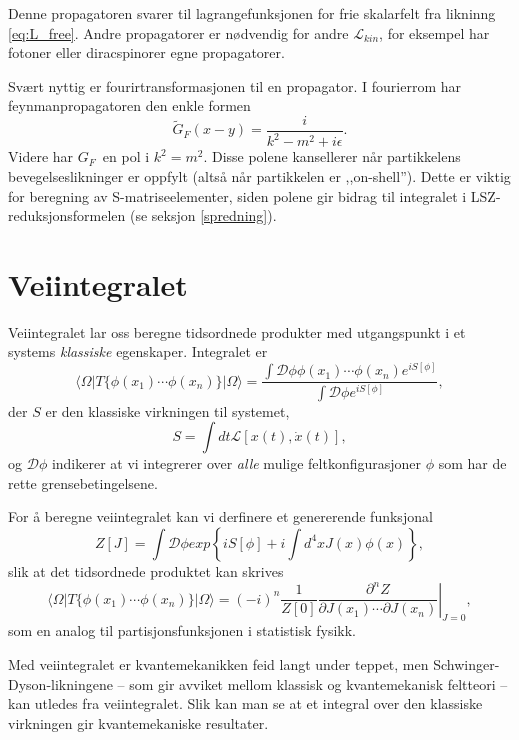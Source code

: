 \documentclass{article}
\renewcommand{\L}{\mathcal{L}}
\newcommand{\D}{\mathcal{D}}
\newcommand{\bra}[1]{\langle {#1} \mathclose|}
\newcommand{\ket}[1]{\mathopen| {#1} \rangle}
\begin{document}
Denne propagatoren svarer til lagrangefunksjonen for frie skalarfelt fra likninng \eqref{eq:L_free}.
Andre propagatorer er nødvendig for andre $\L_{kin}$, for eksempel har fotoner eller diracspinorer egne propagatorer.

Svært nyttig er fourirtransformasjonen til en propagator. 
I fourierrom har feynmanpropagatoren den enkle formen
\begin{equation*}
    \tilde{G}_F(x - y) = \frac{i}{k^2 - m^2 + i\epsilon}.
\end{equation*}
Videre har $G_F$ en pol i $k^2 = m^2$. 
Disse polene kansellerer når partikkelens bevegelseslikninger er oppfylt (altså når partikkelen er ,,on-shell'').
Dette er viktig for beregning av S-matriseelementer, siden polene gir bidrag til integralet i LSZ-reduksjonsformelen (se seksjon \ref{spredning}).

\section{Veiintegralet}
Veiintegralet lar oss beregne tidsordnede produkter med utgangspunkt i et systems \emph{klassiske} egenskaper.
Integralet er 
\begin{equation*}
        \bra{\Omega} T\{\phi(x_1) \cdots \phi(x_n)\}\ket{\Omega}
        = \frac{\int \D \phi \phi(x_1) \cdots \phi(x_n) e^{iS[\phi]}}{\int \D \phi e^{iS[\phi]}},
\end{equation*}
der $S$ er den klassiske virkningen til systemet,
\begin{equation*}
    S = \int dt \L[x(t), \dot{x}(t)],
\end{equation*}
og $\D\phi$ indikerer at vi integrerer over \emph{alle} mulige feltkonfigurasjoner $\phi$ som har de rette grensebetingelsene.

For å beregne veiintegralet kan vi derfinere et genererende funksjonal
\begin{equation*}
    Z[J] = \int \D \phi exp \left\{iS[\phi] + i\int d^4x J(x)\phi(x)\right\},
\end{equation*}
slik at det tidsordnede produktet kan skrives
\begin{equation*}
        \bra{\Omega} T\{\phi(x_1) \cdots \phi(x_n)\}\ket{\Omega}
        = (-i)^n \frac{1}{Z[0]} 
        \left. \frac{\partial^n Z}{\partial J(x_1) \cdots \partial J(x_n)} \right\rvert_{J=0},
\end{equation*}
som en analog til partisjonsfunksjonen i statistisk fysikk.

Med veiintegralet er kvantemekanikken feid langt under teppet, men Schwinger-Dyson-likningene -- som gir avviket mellom klassisk og kvantemekanisk feltteori -- kan utledes fra veiintegralet.
Slik kan man se at et integral over den klassiske virkningen gir kvantemekaniske resultater.
\end{document}

